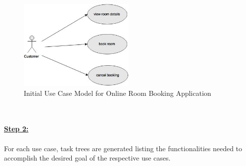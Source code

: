 \begin{figure}[H]
\begin{center}
\includegraphics[width=0.5\textwidth]{figures/use-case-two}
\caption{Initial Use Case Model for Online Room Booking Application}
\label{fig:selection_by_use_case/use_case_two}
\end{center}
\end{figure}
\\
\\
\textbf{\underline{Step 2:}}
\\
\\
For each use case, task trees are generated listing the functionalities needed to accomplish the desired goal of the respective use cases.
\\
